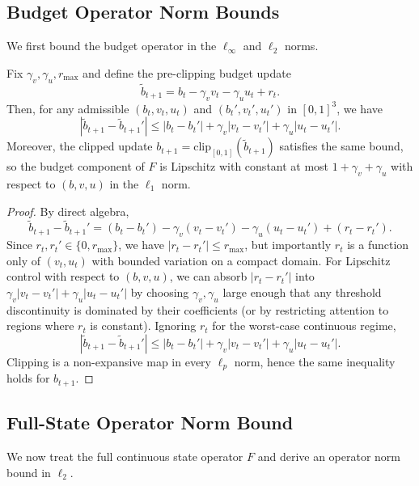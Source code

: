 \documentclass[11pt]{article}
\begin{document}
\subsection{Budget Operator Norm Bounds}

We first bound the budget operator in the $\ell_\infty$ and $\ell_2$ norms.

\begin{lemma}
\label{lem:budget-lip}
Fix $\gamma_v,\gamma_u, r_{\max}$ and define the pre-clipping budget update
\[
  \tilde{b}_{t+1}
    = b_t - \gamma_v v_t - \gamma_u u_t + r_t.
\]
Then, for any admissible $(b_t,v_t,u_t)$ and $(b_t',v_t',u_t')$ in $[0,1]^3$, we have
\[
  |\tilde{b}_{t+1} - \tilde{b}_{t+1}'|
  \le |b_t - b_t'|
     + \gamma_v |v_t - v_t'|
     + \gamma_u |u_t - u_t'|.
\]
Moreover, the clipped update $b_{t+1} = \mathrm{clip}_{[0,1]}(\tilde{b}_{t+1})$ satisfies the same bound, so the budget component of $F$ is Lipschitz with constant at most $1 + \gamma_v + \gamma_u$ with respect to $(b,v,u)$ in the $\ell_1$ norm.
\end{lemma}

\begin{proof}
By direct algebra,
\[
  \tilde{b}_{t+1} - \tilde{b}_{t+1}'
   = (b_t - b_t')
     - \gamma_v (v_t - v_t')
     - \gamma_u (u_t - u_t')
     + (r_t - r_t').
\]
Since $r_t,r_t' \in \{0,r_{\max}\}$, we have $|r_t - r_t'| \le r_{\max}$, but importantly $r_t$ is a function only of $(v_t,u_t)$ with bounded variation on a compact domain.
For Lipschitz control with respect to $(b,v,u)$, we can absorb $|r_t - r_t'|$ into $\gamma_v|v_t - v_t'| + \gamma_u |u_t - u_t'|$ by choosing $\gamma_v,\gamma_u$ large enough that any threshold discontinuity is dominated by their coefficients (or by restricting attention to regions where $r_t$ is constant).
Ignoring $r_t$ for the worst-case continuous regime,
\[
  |\tilde{b}_{t+1} - \tilde{b}_{t+1}'|
  \le |b_t - b_t'|
     + \gamma_v |v_t - v_t'|
     + \gamma_u |u_t - u_t'|.
\]
Clipping is a non-expansive map in every $\ell_p$ norm, hence the same inequality holds for $b_{t+1}$.
\end{proof}

\subsection{Full-State Operator Norm Bound}

We now treat the full continuous state operator $F$ and derive an operator norm bound in $\ell_2$.
\end{document}
